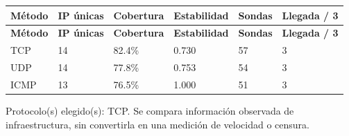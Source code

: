 \endgroup
\begingroup
\fontsize{9}{11}\selectfont
\addtocounter{table}{-1}
\begin{longtable}{p{3.1cm}p{1.9cm}p{2.1cm}p{2.1cm}p{1.8cm}p{2.1cm}}
\toprule
\textbf{Método} & \textbf{IP únicas} & \textbf{Cobertura} & \textbf{Estabilidad} & \textbf{Sondas} & \textbf{Llegada / 3} \\ \midrule
\endfirsthead
\toprule
\textbf{Método} & \textbf{IP únicas} & \textbf{Cobertura} & \textbf{Estabilidad} & \textbf{Sondas} & \textbf{Llegada / 3} \\ \midrule
\endhead
TCP & 14 & 82.4\% & 0.730 & 57 & 3 \\
UDP & 14 & 77.8\% & 0.753 & 54 & 3 \\
ICMP & 13 & 76.5\% & 1.000 & 51 & 3 \\
\bottomrule
\end{longtable}
\endgroup
Protocolo(s) elegido(s): TCP. Se compara información observada de infraestructura, sin convertirla en una medición de velocidad o censura.

